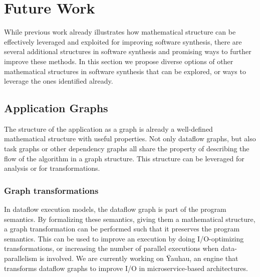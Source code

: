 \documentclass[sigplan,10pt]{acmart}
\begin{document}

\section{Future Work}
\label{sec:future}

While previous work already illustrates how mathematical structure can be effectively leveraged and exploited for improving software synthesis, there are several additional structures in software synthesis and promising ways to further improve these methods.
In this section we propose diverse options of other mathematical structures in software synthesis that can be explored, or ways to leverage the ones identified already.

\subsection{Application Graphs}

The structure of the application as a graph is already a well-defined mathematical structure with useful properties.
Not only dataflow graphs, but also task graphs or other dependency graphs all share the property of describing the flow of the algorithm in a graph structure.
This structure can be leveraged for analysis or for transformations.

\subsubsection{Graph transformations}
In dataflow execution models, the dataflow graph is part of the program semantics. By formalizing these semantics, giving them a mathematical structure, a graph transformation can be performed such that it preserves the program semantics.
This can be used to improve an execution by doing I/O-optimizing transformations, or increasing the number of parallel executions when data-parallelism is involved.
We are currently working on \"Yauhau, an engine that transforms dataflow graphs to improve I/O in microservice-based architectures. 
\end{document}
